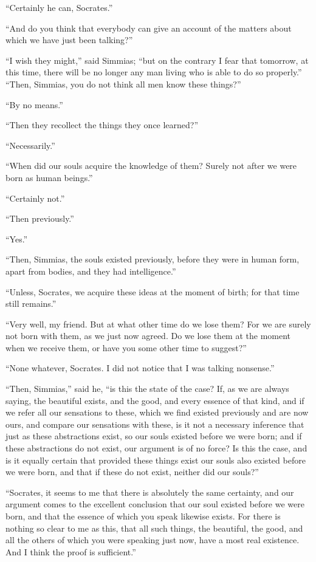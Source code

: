 \documentclass[letterpaper,12pt]{article}
\newcommand{\stephpag}[1]{\marginnote{\small\itshape\fontfamily{ppl}\selectfont #1}}
\begin{document}
\begin{drama}
``Certainly he can, Socrates.''
 
``And do you think that everybody can give an account of the matters about which we have just been talking?''
 
``I wish they might,'' said Simmias; ``but on the contrary I fear that tomorrow, at this time, there will be no longer any man living who is able to do so properly.'' \stephpag{c} ``Then, Simmias, you do not think all men know these things?''
 
``By no means.''
 
``Then they recollect the things they once learned?''
 
``Necessarily.''
 
``When did our souls acquire the knowledge of them? Surely not after we were born as human beings.''
 
``Certainly not.''
 
``Then previously.''
 
``Yes.''
 
``Then, Simmias, the souls existed previously, before they were in human form, apart from bodies, and they had intelligence.''
 
``Unless, Socrates, we acquire these ideas at the moment of birth; for that time \stephpag{d} still remains.''
 
``Very well, my friend. But at what other time do we lose them? For we are surely not born with them, as we just now agreed. Do we lose them at the moment when we receive them, or have you some other time to suggest?''
 
``None whatever, Socrates. I did not notice that I was talking nonsense.''
 
``Then, Simmias,'' said he, ``is this the state of the case? If, as we are always saying, the beautiful exists, and the good, and every essence of that kind, and if we refer all our sensations to these, \stephpag{e} which we find existed previously and are now ours, and compare our sensations with these, is it not a necessary inference that just as these abstractions exist, so our souls existed before we were born; and if these abstractions do not exist, our argument is of no force? Is this the case, and is it equally certain that provided these things exist our souls also existed before we were born, and that if these do not exist, neither did our souls?''
 
``Socrates, it seems to me that there is absolutely the same certainty, and our argument comes to the excellent conclusion that \stephpag{77 a} our soul existed before we were born, and that the essence of which you speak likewise exists. For there is nothing so clear to me as this, that all such things, the beautiful, the good, and all the others of which you were speaking just now, have a most real existence. And I think the proof is sufficient.''
 

\end{drama}
\end{document}
